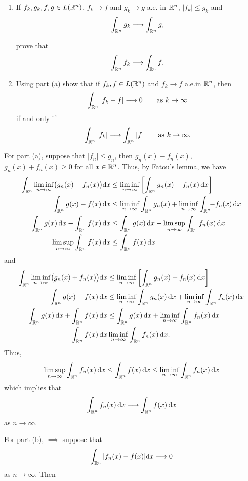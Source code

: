 \begin{problem}
\begin{enumerate}[label=(\alph*)]
\item If \(f_k,g_k,f,g\in L(\mathbb{R}^n)\), \(f_k\to f\) and \(g_k\to g\) a.e.\@
  in \(\mathbb{R}^n\), \(|f_k|\leq g_k\) and
  \[
    \int_{\mathbb{R}^n}g_k\longrightarrow\int_{\mathbb{R}^n}g,
  \]

  prove that
  \[
    \int_{\mathbb{R}^n} f_k\longrightarrow\int_{\mathbb{R}^n}f.
  \]
\item Using part (a) show that if \(f_k,f\in L(\mathbb{R}^n)\) and \(f_k\to f\)
  a.e.\@ in \(\mathbb{R}^n\), then
  \[
    \int_{\mathbb{R}^n}|f_k-f|\longrightarrow 0\qquad\text{as \(k\to\infty\)}
  \]
  if and only if
  \[
    \int_{\mathbb{R}^n}|f_k|\longrightarrow\int_{\mathbb{R}^n}|f|\qquad\text{as
      \(k\to\infty\)}.
  \]
\end{enumerate}
\end{problem}
\begin{solution}
  For part (a), suppose that \(|f_n|\leq g_n\), then \(g_n(x)-f_n(x)\),
  \(g_n(x)+f_n(x)\geq 0\) for all \(x\in\mathbb{R}^n\). Thus, by Fatou's lemma,
  we have
  \begin{align*}
    \int_{\bbR^n}\liminf_{n\to\infty}\bigl(g_n(x)-f_n(x)\bigr)\rmd x
    &\leq\liminf_{n\to\infty}\left[\int_{\bbR^n}g_n(x)-f_n(x)\diff x\right]\\
    \int_{\bbR^n}g(x)-f(x)\diff x
    &\leq\liminf_{n\to\infty}\int_{\bbR^n}g_n(x)+\liminf_{n\to\infty}\int_{\mathrlap{\bbR^n}\phantom{-}}-f_n(x)\diff
      x\\
    \int_{\bbR^n}g(x)\diff x-\int_{\bbR^n}f(x)\diff x
    &\leq\int_{\bbR^n}g(x)\diff x-\limsup_{n\to\infty}\int_{\bbR^n}f_n(x)\diff
      x\\
    \limsup_{n\to\infty}\int_{\bbR^n}f(x)\diff x&\leq\int_{\bbR^n}f(x)\diff
                                                  x
  \end{align*}
  and
  \begin{align*}
    \int_{\bbR^n}\liminf_{n\to\infty}\bigl(g_n(x)+f_n(x)\bigr)\rmd x
    &\leq\liminf_{n\to\infty}\left[\int_{\bbR^n}g_n(x)+f_n(x)\diff
      x\right]\\
    \int_{\bbR^n}g(x)+f(x)\diff x
    &\leq\liminf_{n\to\infty}\int_{\bbR^n}g_n(x)\diff x
      +\liminf_{n\to\infty}\int_{\bbR^n}f_n(x)\diff x\\
    \int_{\bbR^n}g(x)\diff x+\int_{\bbR^n}f(x)\diff x
    &\leq\int_{\bbR^n}g(x)\diff
      x+\liminf_{n\to\infty}\int_{\bbR^n}f_n(x)\diff x\\
    \int_{\bbR^n}f(x)\diff x&\liminf_{n\to\infty}\int_{\bbR^n}f_n(x)\diff x.
  \end{align*}
  Thus,
  \[
    \limsup_{n\to\infty}\int_{\mathbb{R}^n}f_n(x)\mathop{}\!\mathrm{d} x\leq
    \int_{\mathbb{R}^n}f(x)\mathop{}\!\mathrm{d} x\leq
    \liminf_{n\to\infty}\int_{\mathbb{R}^n}f_n(x)\mathop{}\!\mathrm{d} x
  \]
  which implies that
  \[
    \int_{\mathbb{R}^n}f_n(x)\mathop{}\!\mathrm{d} x\longrightarrow\int_{\mathbb{R}^n}f(x)\mathop{}\!\mathrm{d} x
  \]
  as \(n\to\infty\).

  For part (b), \(\implies\) suppose that
  \[
    \int_{\mathbb{R}^n}|f_n(x)-f(x)|\mathrm{d} x\longrightarrow 0
  \]
  as \(n\to\infty\). Then
\end{solution}

